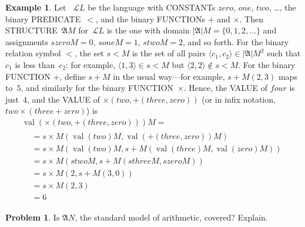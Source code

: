 \documentclass[10pt,a4paper]{article}
\newcommand*{\olup}[1]{\MakeUppercase{#1}}
\theoremstyle{plain}
\theoremstyle{definition}
\newtheorem{ex}[thm]{Example}
\newtheorem{prob}{Problem}[section]
\theoremstyle{remark}
\newcommand*{\olfileid}[3]{}
\providecommand{\Obj}{}
\providecommand{\Struct}{\ensuremath{\mathfrak{A}}}
\providecommand{\Domain}{\ensuremath{|\mathfrak{A}|}}
\providecommand{\Assign}{\ensuremath{s}}
\providecommand{\Lang}{\ensuremath{\mathcal{L}}}
\providecommand{\tuple}[1]{\langle #1 \rangle}
\providecommand{\Value}[1]{\operatorname{val}(#1)}
\begin{document}
\begin{ex}
Let ~$\Lang L$ be the language with \olup{constant}s $\Obj{zero}$,
$\Obj{one}$, $\Obj{two}$, \dots, the binary \olup{predicate}~$<$, and the
binary \olup{function}s $+$ and $\times$. Then \olup{structure}~$\Struct
M$ for~$\Lang L$ is the one with domain $\Domain M = \{0, 1, 2, \ldots
\}$ and assignments $\Assign{\Obj{zero}}{M} = 0$,
$\Assign{\Obj{one}}{M} = 1$, $\Assign{\Obj{two}}{M} = 2$, and so
forth. For the binary relation symbol $<$, the set $\Assign{<}{M}$ is
the set of all pairs $\tuple{c_1, c_2} \in \Domain{M}^2$ such that
$c_1$ is less than~$c_2$: for example, $\tuple{1, 3} \in
\Assign{<}{M}$ but $\tuple{2, 2} \notin \Assign{<}{M}$. For the binary
\olup{function} $+$, define $\Assign{+}{M}$ in the usual way---for
example, $\Assign{+}{M}(2,3)$ maps to~$5$, and similarly for the
binary \olup{function}~$\times$. Hence, the \olup{value} of $\Obj{four}$ is
just~$4$, and the \olup{value} of $\times(\Obj{two},
+(\Obj{three},\Obj{zero}))$ (or in infix notation, $\Obj{two} \times
(\Obj{three} + \Obj{zero})$) is
\begin{multline*}
\Value{\times(\Obj{two}, +(\Obj{three},\Obj{zero}))}{M} =\\
\begin{aligned}
& =\Assign{\times}{M}(\Value{\Obj{two}}{M}, \Value{+(\Obj{three}, \Obj{zero})}{M})\\
& = \Assign{\times}{M}(\Value{\Obj{two}}{M}, \Assign{+}{M}(\Value{\Obj{three}}{M},
\Value{\Obj{zero}}{M})) \\
& = \Assign{\times}{M}(\Assign{\Obj{two}}{M}, \Assign{+}{M}(\Assign{\Obj{three}}{M},
\Assign{\Obj{zero}}{M})) \\
& = \Assign{\times}{M}(2, \Assign{+}{M}(3, 0)) \\
& = \Assign{\times}{M}(2, 3) \\
& = 6
\end{aligned}
\end{multline*}
\end{ex}

\begin{prob}
Is $\Struct N$, the standard model of arithmetic, covered? Explain.
\end{prob}





\olfileid{fol}{syn}{ext}
\end{document}
